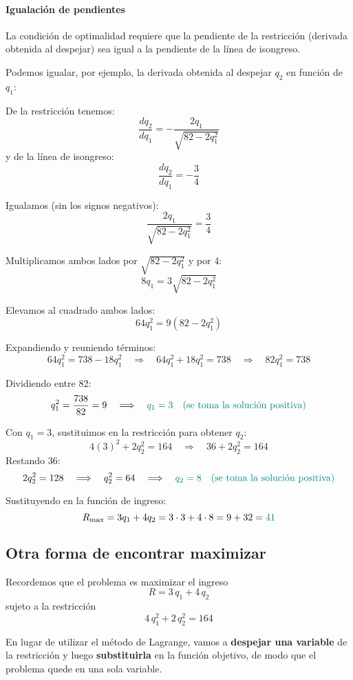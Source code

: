 \documentclass{article}
\begin{document}
\bigskip
\paragraph{Igualación de pendientes}

La condición de optimalidad requiere que la pendiente de la restricción (derivada obtenida al despejar) sea igual a la pendiente de la línea de isongreso.

Podemos igualar, por ejemplo, la derivada obtenida al despejar \(q_2\) en función de \(q_1\):

De la restricción tenemos:
\[
\frac{dq_2}{dq_1} = -\frac{2q_1}{\sqrt{82-2q_1^2}}
\]
y de la línea de isongreso:
\[
\frac{dq_2}{dq_1} = -\frac{3}{4}
\]

Igualamos (sin los signos negativos):
\[
\frac{2q_1}{\sqrt{82-2q_1^2}} = \frac{3}{4}
\]

Multiplicamos ambos lados por \(\sqrt{82-2q_1^2}\) y por 4:
\[
8q_1 = 3\sqrt{82-2q_1^2}
\]

Elevamos al cuadrado ambos lados:
\[
64q_1^2 = 9(82-2q_1^2)
\]

Expandiendo y reuniendo términos:
\[
64q_1^2 = 738 - 18q_1^2 
\quad \Longrightarrow \quad 
64q_1^2 + 18q_1^2 = 738 
\quad \Longrightarrow \quad 
82q_1^2 = 738
\]

Dividiendo entre 82:
\[
q_1^2 = \frac{738}{82} = 9 
\quad \Longrightarrow \quad 
\color{teal} q_1 = 3 \quad (\text{se toma la solución positiva})
\]

Con \(q_1 = 3\), sustituimos en la restricción para obtener \(q_2\):
\[
4(3)^2 + 2q_2^2 = 164 
\quad \Longrightarrow \quad 
36 + 2q_2^2 = 164
\]
Restando 36:
\[ 
2q_2^2 = 128 
\quad \Longrightarrow \quad 
q_2^2 = 64 
\quad \Longrightarrow \quad 
\color{teal} q_2 = 8 \quad (\text{se toma la solución positiva})
\]

Sustituyendo en la función de ingreso:
\[
R_{\max} = 3q_1 + 4q_2 = 3\cdot 3 + 4\cdot 8 = 9 + 32 = \color{teal} 41
\]

\subsection*{Otra forma de encontrar maximizar}

Recordemos que el problema es maximizar el ingreso
\[
R = 3\,q_1 + 4\,q_2
\]
sujeto a la restricción 
\[
4\,q_1^2 + 2\,q_2^2 = 164
\]

En lugar de utilizar el método de Lagrange, vamos a \textbf{despejar una variable} de la restricción y luego \textbf{substituirla} en la función objetivo, de modo que el problema quede en una sola variable.
\end{document}
